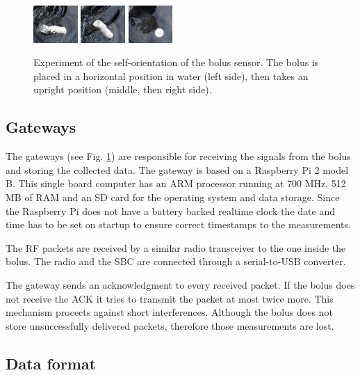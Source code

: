 \documentclass[conference]{IEEEtran}
\begin{document}
\begin{figure}[htbp]
\centerline{
  \includegraphics[width=0.15\textwidth]{fig/kfj_1.png}
  \includegraphics[width=0.15\textwidth]{fig/kfj_2.png}
  \includegraphics[width=0.15\textwidth]{fig/kfj_3.png}
  }
  \caption{Experiment of the self-orientation of the bolus sensor. The
  bolus is placed in a horizontal position in water (left side), then takes
  an upright position (middle, then right side).}
\label{bolus-gw-photo}
\end{figure}

\subsection{Gateways}

The gateways (see Fig. \ref{bolus-gw-photo}) are responsible for receiving
the signals from the bolus and
storing the collected data. The gateway is based on a Raspberry Pi 2 model B.
This single board computer has an ARM processor running at 700 MHz, 512 MB of
RAM and an SD card for the operating system and data storage. Since the
Raspberry Pi does not have a battery backed realtime clock the date and
time has to be set on startup to ensure correct timestamps to the
measurements.

The RF packets are received by a similar radio transceiver to the one inside the
bolus. The radio and the SBC are connected through a serial-to-USB converter.

The gateway sends an acknowledgment to every received packet. If the bolus
does not receive the ACK it tries to transmit the packet at most twice more.
This mechanism procects against short interferences. Although the bolus does
not store unsuccessfully delivered packets, therefore those measurements are
lost.

\subsection{Data format}
\end{document}
